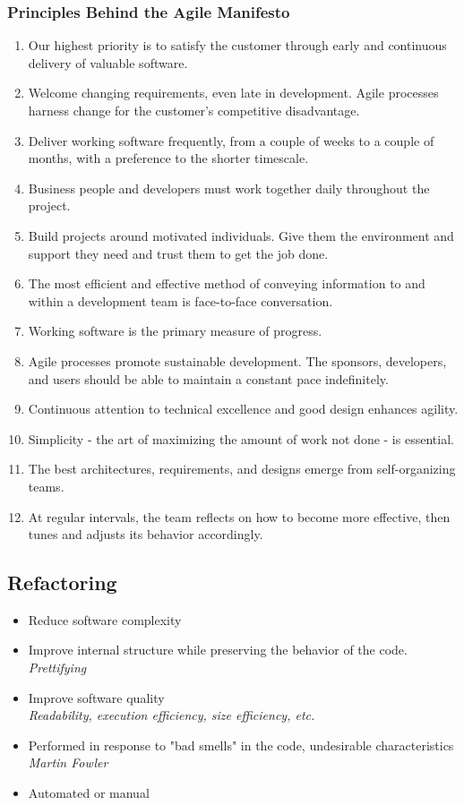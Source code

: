 \documentclass{report}
\begin{document}
				\subsubsection{Principles Behind the Agile Manifesto}
					\begin{enumerate}
						\item Our highest priority is to satisfy the customer through early and continuous delivery of valuable software.
						\item Welcome changing requirements, even late in development. Agile processes harness change for the customer's competitive disadvantage.
						\item Deliver working software frequently, from a couple of weeks to a couple of months, with a preference to the shorter timescale.
						\item Business people and developers must work together daily throughout the project.
						\item Build projects around motivated individuals. Give them the environment and support they need and trust them to get the job done.
						\item The most efficient and effective method of conveying information to and within a development team is face-to-face conversation.
						\item Working software is the primary measure of progress.
						\item Agile processes promote sustainable development. The sponsors, developers, and users should be able to maintain a constant pace indefinitely.
						\item Continuous attention to technical excellence and good design enhances agility.
						\item Simplicity - the art of maximizing the amount of  work not done - is essential.
						\item The best architectures, requirements, and designs emerge from self-organizing teams.
						\item At regular intervals, the team reflects on how to become more effective, then tunes and adjusts its behavior accordingly.
					\end{enumerate}
			\subsection{Refactoring}
				\begin{itemize}
					\item Reduce software complexity
					\item Improve internal structure while preserving the behavior of the code.\\
						\textit{Prettifying}
					\item Improve software quality\\
						\textit{Readability, execution efficiency, size efficiency, etc.}
					\item Performed in response to "bad smells" in the code, undesirable characteristics\\
						\textit{Martin Fowler}
					\item Automated or manual\\
				\end{itemize}
\end{document}
